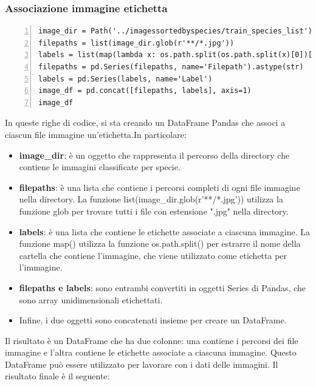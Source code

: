 \documentclass[a4paper,final,12pt]{report}
\begin{document}
\subsubsection{Associazione immagine etichetta}
\begin{lstlisting}[caption={Associazione immagini alle relative etichette.}, label={lst:Associazione_immagine_etichetta}, breaklines, escapechar=`\%, frame=lines, basicstyle=\small\ttfamily, keepspaces=true, numbers=left]
image_dir = Path('../imagessortedbyspecies/train_species_list')
filepaths = list(image_dir.glob(r'**/*.jpg'))
labels = list(map(lambda x: os.path.split(os.path.split(x)[0])[1], filepaths))
filepaths = pd.Series(filepaths, name='Filepath').astype(str)
labels = pd.Series(labels, name='Label')
image_df = pd.concat([filepaths, labels], axis=1)
image_df
\end{lstlisting}
In queste righe di codice, si sta creando un DataFrame Pandas che associ a ciascun file immagine un'etichetta.In particolare:
\begin{itemize}
    \item \textbf{image\_dir}: è un oggetto che rappresenta il percorso della directory che contiene le immagini classificate per specie.
    \item \textbf{filepaths}: è una lista che contiene i percorsi completi di ogni file immagine nella directory. La funzione list(image\_dir.glob(r'**/*.jpg')) utilizza la funzione glob per trovare tutti i file con estensione ".jpg" nella directory.
    \item \textbf{labels}: è una lista che contiene le etichette associate a ciascuna immagine. La funzione map()  utilizza la funzione os.path.split() per estrarre il nome della cartella che contiene l'immagine, che viene utilizzato come etichetta per l'immagine.
    \item \textbf{filepaths e labels}: sono entrambi convertiti in oggetti Series di Pandas, che sono array unidimensionali etichettati.
    \item Infine, i due oggetti sono concatenati insieme per creare un DataFrame.
\end{itemize}
Il risultato è un DataFrame che ha due colonne: una contiene i percorsi dei file immagine e l'altra contiene le etichette associate a ciascuna immagine. Questo DataFrame può essere utilizzato per lavorare con i dati delle immagini. Il risultato finale è il seguente:
\end{document}
